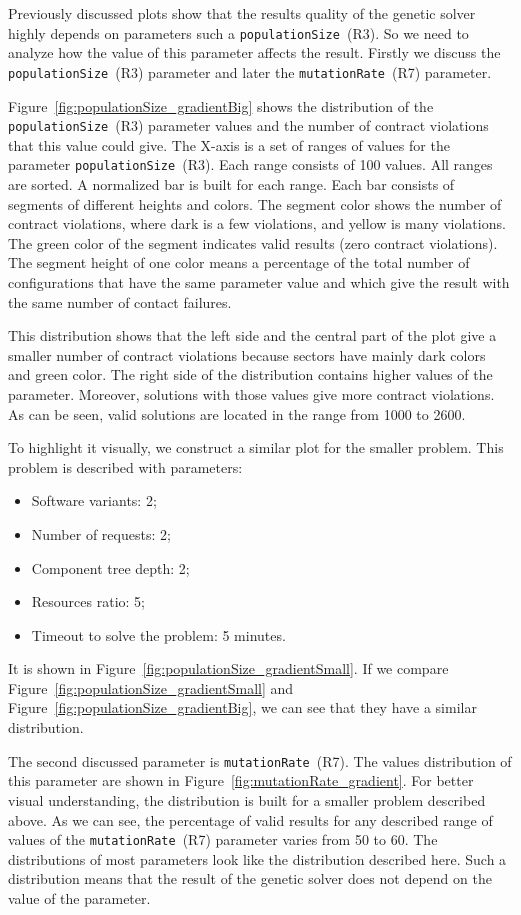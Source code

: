 Previously discussed plots show that the results quality of the genetic solver highly depends on parameters such a \texttt{populationSize}~(R3). So we need to analyze how the value of this parameter affects the result. Firstly we discuss the \texttt{populationSize}~(R3) parameter and later the \texttt{mutationRate}~(R7) parameter.

Figure~\ref{fig:populationSize_gradientBig} shows the distribution of the \texttt{populationSize}~(R3) parameter values and the number of contract violations that this value could give. The X-axis is a set of ranges of values for the parameter \texttt{populationSize}~(R3). Each range consists of 100 values. All ranges are sorted. A normalized bar is built for each range. Each bar consists of segments of different heights and colors. The segment color shows the number of contract violations, where dark is a few violations, and yellow is many violations. The green color of the segment indicates valid results (zero contract violations). The segment height of one color means a percentage of the total number of configurations that have the same parameter value and which give the result with the same number of contact failures.

This distribution shows that the left side and the central part of the plot give a smaller number of contract violations because sectors have mainly dark colors and green color. The right side of the distribution contains higher values of the parameter. Moreover, solutions with those values give more contract violations. As can be seen, valid solutions are located in the range from 1000 to 2600.

To highlight it visually, we construct a similar plot for the smaller problem. This problem is described with parameters:
\begin{itemize}
	\item Software variants: 2;
	\item Number of requests: 2;
	\item Component tree depth: 2;
	\item Resources ratio: 5;
	\item Timeout to solve the problem: 5 minutes.
\end{itemize}

It is shown in Figure~\ref{fig:populationSize_gradientSmall}. If we compare Figure~\ref{fig:populationSize_gradientSmall} and Figure~\ref{fig:populationSize_gradientBig}, we can see that they have a similar distribution.

The second  discussed parameter is \texttt{mutationRate}~(R7). The values distribution of this parameter are shown in Figure~\ref{fig:mutationRate_gradient}. For better visual understanding, the distribution is built for a smaller problem described above. 
As we can see, the percentage of valid results for any described range of values of the \texttt{mutationRate}~(R7) parameter varies from 50 to 60. The distributions of most parameters look like the distribution described here. Such a distribution means that the result of the genetic solver does not depend on the value of the parameter. 

